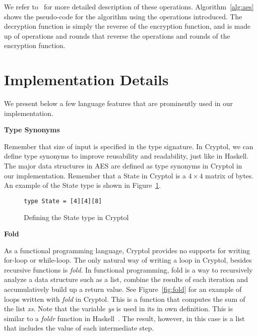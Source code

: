 \documentclass[a4paper, notitlepage]{report}
\renewcommand{\paragraph}[1]{\vspace*{1em}\noindent\textbf{#1}\hspace*{1em}}
\begin{document}
We refer to~\cite{standard2001announcing} for more detailed description of these
operations. Algorithm~\ref{alg:aes} shows the pseudo-code for the algorithm using
the operations
introduced.
The decryption function is simply the reverse of the encryption function, and
is made up of operations and rounds that reverse the operations and rounds of
the encryption function.


\section{Implementation Details}


We present below a few language features that are prominently used in our
implementation.

\paragraph{Type Synonyms}

Remember that size of input is specified in the type signature.
In Cryptol, we can define type synonyms to improve reusability and readability,
just like in Haskell.
The major data structures in AES are defined as type synonyms in Cryptol in our
implementation.
Remember that a State in Cryptol is a $4 \times 4$ matrix of bytes. An example
of the State type is shown in Figure~\ref{fig:typedef}. 

\begin{figure}
  \begin{lstlisting}[frame=single]
    type State = [4][4][8]
  \end{lstlisting}
  \caption{Defining the State type in Cryptol}
  \label{fig:typedef}
\end{figure}


\paragraph{Fold}

As a functional programming language, Cryptol provides no supports for writing
for-loop or
while-loop. The only natural way of writing a loop in Cryptol, besides recursive
functions is \emph{fold}.
In functional programming, fold is a way to recursively analyze a data structure
such as a list, combine the results of each iteration and accumulatively build up
a return value.
See Figure~\ref{fig:fold} for an example of loops written with \emph{fold} in
Cryptol.
This is a function that computes the sum of the list \emph{xs}.
Note that the variable \emph{ys} is used in its in own definition.
This is similar to a \emph{foldr} function in Haskell~\cite{lipovaca2011learn}.
The result, however, in this case is a list that includes the value of each
intermediate step.
\end{document}
